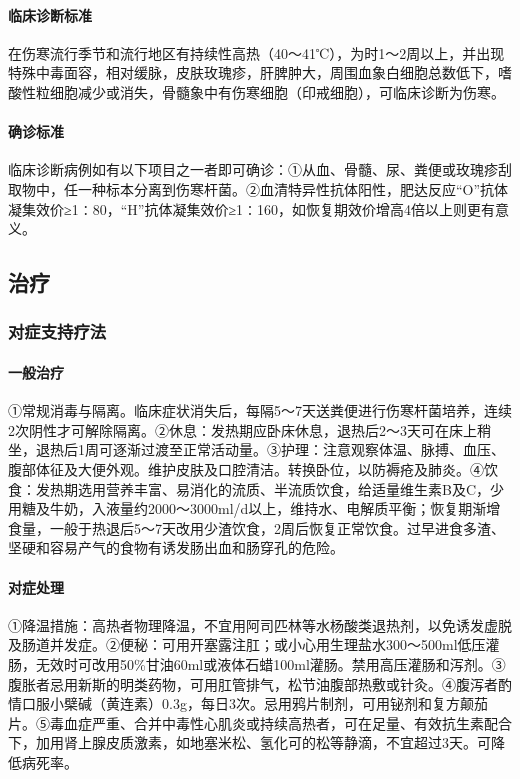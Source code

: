 \paragraph{临床诊断标准}

在伤寒流行季节和流行地区有持续性高热（40～41℃），为时1～2周以上，并出现特殊中毒面容，相对缓脉，皮肤玫瑰疹，肝脾肿大，周围血象白细胞总数低下，嗜酸性粒细胞减少或消失，骨髓象中有伤寒细胞（印戒细胞），可临床诊断为伤寒。

\paragraph{确诊标准}

临床诊断病例如有以下项目之一者即可确诊：①从血、骨髓、尿、粪便或玫瑰疹刮取物中，任一种标本分离到伤寒杆菌。②血清特异性抗体阳性，肥达反应“O”抗体凝集效价≥1∶80，“H”抗体凝集效价≥1∶160，如恢复期效价增高4倍以上则更有意义。

\subsection{治疗}

\subsubsection{对症支持疗法}

\paragraph{一般治疗}

①常规消毒与隔离。临床症状消失后，每隔5～7天送粪便进行伤寒杆菌培养，连续2次阴性才可解除隔离。②休息：发热期应卧床休息，退热后2～3天可在床上稍坐，退热后1周可逐渐过渡至正常活动量。③护理：注意观察体温、脉搏、血压、腹部体征及大便外观。维护皮肤及口腔清洁。转换卧位，以防褥疮及肺炎。④饮食：发热期选用营养丰富、易消化的流质、半流质饮食，给适量维生素B及C，少用糖及牛奶，入液量约2000～3000ml/d以上，维持水、电解质平衡；恢复期渐增食量，一般于热退后5～7天改用少渣饮食，2周后恢复正常饮食。过早进食多渣、坚硬和容易产气的食物有诱发肠出血和肠穿孔的危险。

\paragraph{对症处理}

①降温措施：高热者物理降温，不宜用阿司匹林等水杨酸类退热剂，以免诱发虚脱及肠道并发症。②便秘：可用开塞露注肛；或小心用生理盐水300～500ml低压灌肠，无效时可改用50\%甘油60ml或液体石蜡100ml灌肠。禁用高压灌肠和泻剂。③腹胀者忌用新斯的明类药物，可用肛管排气，松节油腹部热敷或针灸。④腹泻者酌情口服小檗碱（黄连素）0.3g，每日3次。忌用鸦片制剂，可用铋剂和复方颠茄片。⑤毒血症严重、合并中毒性心肌炎或持续高热者，可在足量、有效抗生素配合下，加用肾上腺皮质激素，如地塞米松、氢化可的松等静滴，不宜超过3天。可降低病死率。

